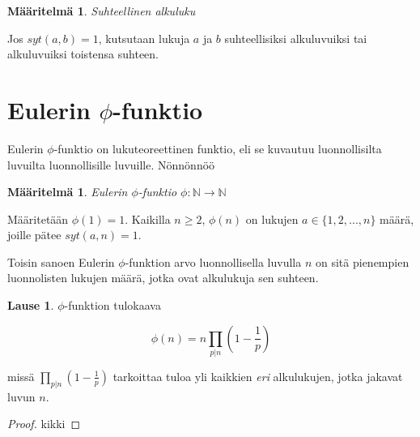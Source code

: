 \documentclass{article}
\theoremstyle{definition}
\newtheorem{maaritelma}[subsection]{Määritelmä}
\newtheorem{lause}[subsection]{Lause}
\begin{document}
\begin{maaritelma}{\emph{Suhteellinen alkuluku}}

Jos $syt(a,b) = 1$, kutsutaan lukuja $a$ ja $b$ suhteellisiksi alkuluvuiksi tai alkuluvuiksi toistensa suhteen.

\end{maaritelma}



\section{Eulerin $\phi$-funktio}

Eulerin $\phi$-funktio on lukuteoreettinen funktio, eli se kuvautuu luonnollisilta luvuilta luonnollisille luvuille. Nönnönnöö

\begin{maaritelma}{\emph{Eulerin $\phi$-funktio $\phi: \mathbb{N} \rightarrow \mathbb{N}$}}

Määritetään $\phi(1) = 1$. Kaikilla $n \geq 2$, $\phi(n)$ on lukujen $a \in \{1,2,...,n\}$ määrä, joille pätee $syt(a,n) = 1$.

Toisin sanoen Eulerin $\phi$-funktion arvo luonnollisella luvulla $n$ on sitä pienempien luonnolisten lukujen määrä, jotka ovat alkulukuja sen suhteen.

\end{maaritelma}

\newpage

\begin{lause}{$\phi$-funktion tulokaava}

\begin{equation*}
    \phi(n) = n \prod_{p \vert n} (1 - \frac{1}{p})
\end{equation*}

missä $\prod_{p \vert n} (1 - \frac{1}{p})$ tarkoittaa tuloa yli kaikkien \emph{eri} alkulukujen, jotka jakavat luvun $n$.

\begin{proof}

kikki

\end{proof}

\end{lause}
\end{document}
